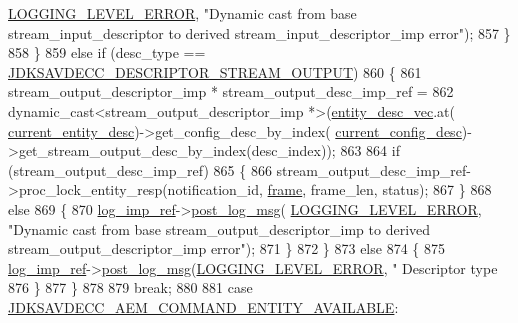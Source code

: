 \begin{DoxyCode}
{      \hyperlink{namespaceavdecc__lib_a501055c431e6872ef46f252ad13f85cdaf2c4481208273451a6f5c7bb9770ec8a}{LOGGING\_LEVEL\_ERROR}, \textcolor{stringliteral}{"Dynamic cast from base stream\_input\_descriptor to derived
       stream\_input\_descriptor\_imp error"});
857             \}
858         \}
859         \textcolor{keywordflow}{else} \textcolor{keywordflow}{if} (desc\_type == \hyperlink{group__descriptor_gab458eb4963f42bfa5591d5dd604bedce}{JDKSAVDECC\_DESCRIPTOR\_STREAM\_OUTPUT})
860         \{
861             stream\_output\_descriptor\_imp * stream\_output\_desc\_imp\_ref =
862                 \textcolor{keyword}{dynamic\_cast<}stream\_output\_descriptor\_imp *\textcolor{keyword}{>}(\hyperlink{classavdecc__lib_1_1end__station__imp_a72edab41bc56e3c1757944a7df188a3d}{entity\_desc\_vec}.at(
      \hyperlink{classavdecc__lib_1_1end__station__imp_afd78c89df26ba7641e1adb764c0e827d}{current\_entity\_desc})->get\_config\_desc\_by\_index(
      \hyperlink{classavdecc__lib_1_1end__station__imp_a60b1af40d35e8a86b0082c54ab6cb6a8}{current\_config\_desc})->get\_stream\_output\_desc\_by\_index(desc\_index));
863 
864             \textcolor{keywordflow}{if} (stream\_output\_desc\_imp\_ref)
865             \{
866                 stream\_output\_desc\_imp\_ref->proc\_lock\_entity\_resp(notification\_id, 
      \hyperlink{gst__avb__playbin_8c_ac8e710e0b5e994c0545d75d69868c6f0}{frame}, frame\_len, status);
867             \}
868             \textcolor{keywordflow}{else}
869             \{
870                 \hyperlink{namespaceavdecc__lib_acbe3e2a96ae6524943ca532c87a28529}{log\_imp\_ref}->\hyperlink{classavdecc__lib_1_1log_a68139a6297697e4ccebf36ccfd02e44a}{post\_log\_msg}(
      \hyperlink{namespaceavdecc__lib_a501055c431e6872ef46f252ad13f85cdaf2c4481208273451a6f5c7bb9770ec8a}{LOGGING\_LEVEL\_ERROR}, \textcolor{stringliteral}{"Dynamic cast from base stream\_output\_descriptor\_imp to derived
       stream\_output\_descriptor\_imp error"});
871             \}
872         \}
873         \textcolor{keywordflow}{else}
874         \{
875             \hyperlink{namespaceavdecc__lib_acbe3e2a96ae6524943ca532c87a28529}{log\_imp\_ref}->\hyperlink{classavdecc__lib_1_1log_a68139a6297697e4ccebf36ccfd02e44a}{post\_log\_msg}(\hyperlink{namespaceavdecc__lib_a501055c431e6872ef46f252ad13f85cdaf2c4481208273451a6f5c7bb9770ec8a}{LOGGING\_LEVEL\_ERROR}, \textcolor{stringliteral}{"
      Descriptor type %
876         \}
877     \}
878 
879     \textcolor{keywordflow}{break};
880 
881     \textcolor{keywordflow}{case} \hyperlink{group__command_ga9fd008c3de503ebf99111e4464e3142d}{JDKSAVDECC\_AEM\_COMMAND\_ENTITY\_AVAILABLE}:
}}
\end{DoxyCode}
